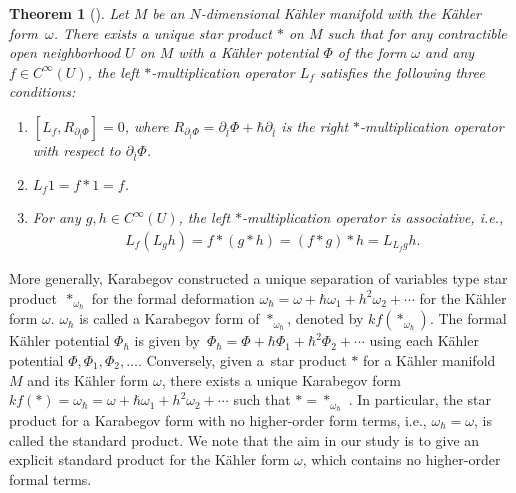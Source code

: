 \documentclass[10pt,a4paper]{amsart}
\numberwithin{equation}{section}
\newtheorem{Theorem}{Theorem}[section]
\begin{document}
\begin{Theorem}[\cite{Kara2,Kara1}]\label{thm_Kara_star_opr}
Let $M$ be an $N$-dimensional K\"ahler manifold
with the K\"ahler form~$\omega$.
 There exists a unique star product $\ast$ on $M$ such that for any contractible open neighborhood $U$ on
 $M$ with a K\"ahler potential $\Phi$ of the form $\omega$ and any
 $
 f
 \in
 C^{\infty}
 (U)
$, the left $\ast$-multiplication operator $L_{f}$ satisfies the following three conditions:
\begin{enumerate}\itemsep=0pt
\item[$(1)$] $[ L_{f}, R_{\partial_{\overline{l}}\Phi}] = 0$,
where
$
 R_{\partial_{\overline{l}}\Phi}
 =
 \partial_{\overline{l}}\Phi
 +
 \hbar
 \partial_{\overline{l}}
$
is the right $\ast$-multiplication operator with respect to $\partial_{\overline{l}}\Phi$.
\item[$(2)$]
$
 L_{f}1
 =
 f
 \ast
 1
 =
 f
$.
\item[$(3)$]
For any $
 g,h
 \in
 C^{\infty}
 (U)
$,
the left $\ast$-multiplication operator is associative, i.e.,
\begin{align*}
 L_{f} ( L_{g} h ) = f \ast ( g \ast h ) = ( f \ast g ) \ast h = L_{ L_{f}g } h .
\end{align*}
\end{enumerate}
\end{Theorem}

More generally, Karabegov constructed a unique separation of variables type star product~$\ast_{\omega_{\hbar}}$ for the formal deformation $\omega_{\hbar}=\omega+\hbar\omega_{1}+h^{2}\omega_{2}+\cdots$ for the K\"ahler form $\omega$. $\omega_{\hbar}$ is called a Karabegov form of $\ast_{\omega_{\hbar}}$, denoted by $kf(\ast_{\omega_{\hbar}})$. The formal K\"ahler potential $\Phi_{\hbar}$ is given by~${\Phi_{\hbar}=\Phi+\hbar\Phi_{1}+\hbar^{2}\Phi_{2}+\cdots}$ using each K\"ahler potential $\Phi, \Phi_{1}, \Phi_{2},\dots$. Conversely, given a~star product $\ast$ for a K\"ahler manifold $M$ and its K\"ahler form $\omega$, there exists a unique Karabegov form $kf(\ast)=\omega_{\hbar}=\omega+\hbar\omega_{1}+h^{2}\omega_{2}+\cdots$ such that $\ast=\ast_{\omega_{\hbar}}$ \cite{Kara5}. In particular, the star product for a Karabegov form with no higher-order form terms, i.e., $\omega_{\hbar}=\omega$, is called the standard product. We note that the aim in our study is to give an explicit standard product for the K\"ahler form $\omega$, which contains no higher-order formal terms.
\end{document}
